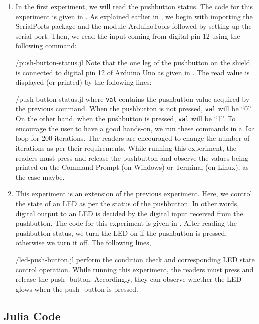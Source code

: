 \begin{enumerate}
\item In the first experiment, we will read the pushbutton status. 
The code for this experiment is given in . 
As explained earlier in , we begin with importing the SerialPorts 
\cite{julia-serial-ports} package and the module ArduinoTools followed by setting up the serial port.
Then, we read the input coming from digital pin 12 using the following
command: 

  {\LocPushjuliacode/push-button-status.jl}
  Note that the one leg of the pushbutton on the shield is connected to digital
pin 12 of Arduino Uno as given in . The read value is displayed (or
printed) by the following lines:

  {\LocPushjuliacode/push-button-status.jl} where {\tt val} contains the pushbutton value acquired by the previous command.
  When the pushbutton is not pressed, {\tt val} will be ``0''. On the other hand,
  when the pushbutton is pressed, {\tt val} will be ``1''. To encourage the user to have a good hands-on, we run these commands in a
{\tt for} loop for 200 iterations. The readers are encouraged to change the number
of iterations as per their requirements. While running this experiment, the readers
must press and release the pushbutton and observe the values being printed
on the Command Prompt (on Windows) or Terminal (on Linux), as the case
maybe.

\item This experiment is an extension of the previous
  experiment. Here, we control the state of an LED as per the status
  of the pushbutton. In other words, digital output to an LED is
  decided by the digital input received from the pushbutton. The code
  for this experiment is given in . After reading
  the pushbutton status, we turn the LED on if the pushbutton is
  pressed, otherwise we turn it off. The following lines, 
  
  {\LocPushjuliacode/led-push-button.jl} perform the condition check
  and corresponding LED state control operation. While running this experiment, the readers must press and release the push-
  button. Accordingly, they can observe whether the LED glows when the push-
  button is pressed.
\end{enumerate}

\subsection{Julia Code}
\label{sec:push-julia-code}

